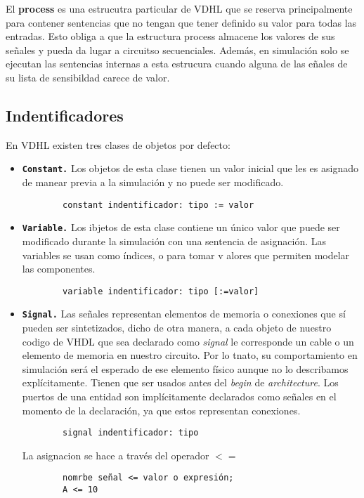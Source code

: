 El \textbf{process} es una estrucutra particular de VDHL que se reserva principalmente para contener sentencias que no tengan que tener definido su valor para todas las entradas. Esto obliga a que la estructura process almacene los valores de sus señales y pueda da lugar a circuitso secuenciales. Además, en simulación solo se ejecutan las sentencias internas a esta estrucura cuando alguna de las eñales de su lista de sensibildad carece de valor. 

\subsection{Indentificadores}

En VDHL existen tres clases de objetos por defecto: 

\begin{itemize}
    \item \texttt{\textbf{Constant.}} Los objetos de esta clase tienen un valor inicial que les es asignado de manear previa a la simulación y no puede ser modificado.   
    
    \begin{lstlisting}
        constant indentificador: tipo := valor
    \end{lstlisting}

    \item \texttt{\textbf{Variable.}} Los ibjetos de esta clase contiene un único valor que puede ser modificado durante la simulación con una sentencia de asignación. Las variables se usan como índices, o para tomar v alores que permiten modelar las componentes.  
    
    \begin{lstlisting}
        variable indentificador: tipo [:=valor]
    \end{lstlisting}

    \item \texttt{\textbf{Signal.}} Las señales representan elementos de memoria o conexiones que sí pueden ser sintetizados, dicho de otra manera, a cada objeto de nuestro codigo de VHDL que sea declarado como \textit{signal} le corresponde un cable o un elemento de memoria en nuestro circuito. Por lo tnato, su comportamiento en simulación será el esperado de ese elemento físico aunque no lo describamos explícitamente. Tienen que ser usados antes del \textit{begin} de \textit{architecture}. Los puertos de una entidad son implícitamente declarados como señales en el momento de la declaración, ya que estos representan conexiones. 

    \begin{lstlisting}
        signal indentificador: tipo
    \end{lstlisting}

    La asignacion se hace a través del operador $<=$

    \begin{lstlisting}
        nomrbe señal <= valor o expresión; 
        A <= 10
    \end{lstlisting}

\end{itemize}
